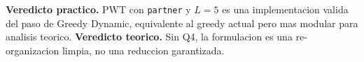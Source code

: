 \documentclass[11pt]{article}
\begin{document}
\textbf{Veredicto practico.} PWT con \texttt{partner} y $L = 5$ es una
implementacion valida del paso de Greedy Dynamic, equivalente al
greedy actual pero mas modular para analisis teorico. \textbf{Veredicto
teorico.} Sin Q4, la formulacion es una re-organizacion limpia, no una
reduccion garantizada.
\end{document}
